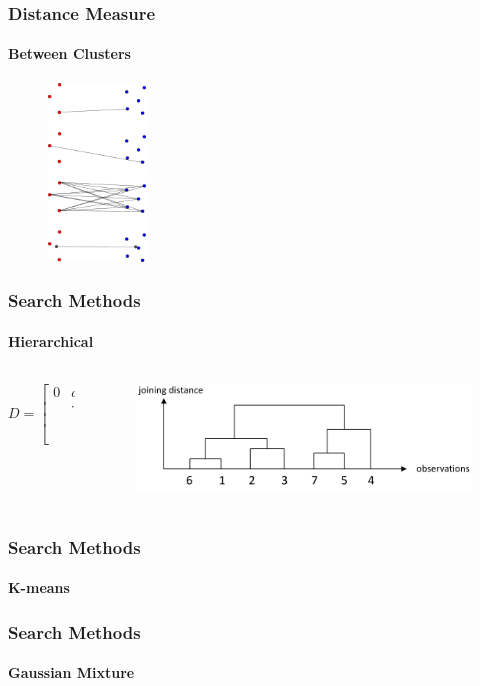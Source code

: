 \documentclass[aspectratio=169,10pt,t]{beamer}
\begin{document}
\begin{frame}[t]
	\frametitle{Distance Measure}
	\framesubtitle{Between Clusters}

	\begin{figure}[h]
		\centering
		\includegraphics[width=0.23\textwidth]{images/linkage.pdf}
	\end{figure}
\end{frame}

\begin{frame}[t]
	\frametitle{Search Methods}
	\framesubtitle{Hierarchical}

	\begin{columns}
		\begin{column}{0.5\textwidth}
			\[
			D = \begin{bmatrix}
				0 & d_{12} & \cdots & d_{1n}\\
					& \ddots & & \\
					&& \ddots& \\
					&&&0
			\end{bmatrix}
			.\] 
		\end{column}
		\begin{column}{0.5\textwidth}
			
			\begin{figure}[h]
				\centering
				\includegraphics[width=1\textwidth]{images/hirakisk-2.png}
			\end{figure}
		\end{column}
	\end{columns}
\end{frame}

\begin{frame}[t]
\frametitle{Search Methods}
	\framesubtitle{K-means}
	
	\begin{figure}[h]
		\centering
	\end{figure}

\end{frame}

\begin{frame}[t]
	\frametitle{Search Methods}
	\framesubtitle{Gaussian Mixture}
	
\end{frame}
\end{document}
